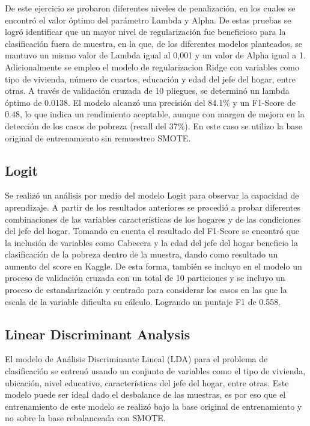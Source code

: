 \documentclass[a4paper]{article}
\theoremstyle{remark}
\theoremstyle{definition}
\begin{document}
De este ejercicio se probaron diferentes niveles de penalización, en los cuales se encontró el valor óptimo del parámetro Lambda  y Alpha. De estas pruebas se logró identificar que un mayor nivel de regularización fue beneficioso para la clasificación fuera de muestra, en la que, de los diferentes modelos planteados, se mantuvo un mismo valor de Lambda igual al 0,001 y un valor de Alpha igual a 1. \\

Adicionalmente se empleo el modelo de regularizacion Ridge con variables como tipo de vivienda, número de cuartos, educación y edad del jefe del hogar, entre otras. A través de validación cruzada de 10 pliegues, se determinó un lambda óptimo de 0.0138. El modelo alcanzó una precisión del 84.1\% y un F1-Score de 0.48, lo que indica un rendimiento aceptable, aunque con margen de mejora en la detección de los casos de pobreza (recall del 37\%). En este caso se utilizo la base original de entrenamiento sin remuestreo SMOTE.

\subsection{Logit}

Se realizó un análisis por medio del modelo Logit para observar la capacidad de aprendizaje. A partir de los resultados anteriores se procedió a probar diferentes combinaciones de las variables características de los hogares y de las condiciones del jefe del hogar. Tomando en cuenta el resultado del F1-Score se encontró que la inclusión de variables como Cabecera y la edad del jefe del hogar beneficio la clasificación de la pobreza dentro de la muestra, dando como resultado un aumento del score en Kaggle. De esta forma, también se incluyo en el modelo un proceso de validación cruzada con un total de 10 particiones y se incluyo un proceso de estandarización y centrado para considerar los casos en las que la escala de la variable dificulta su cálculo. Logrando un puntaje F1 de 0.558.

\subsection{Linear Discriminant Analysis}

El modelo de Análisis Discriminante Lineal (LDA) para el problema de clasificación se entrenó usando un conjunto de variables como el tipo de vivienda, ubicación, nivel educativo, características del jefe del hogar, entre otras. Este modelo puede ser ideal dado el desbalance de las muestras, es por eso que el entrenamiento de este modelo se realizó bajo la base original de entrenamiento y no sobre la base rebalanceada con SMOTE.  \\
\end{document}
